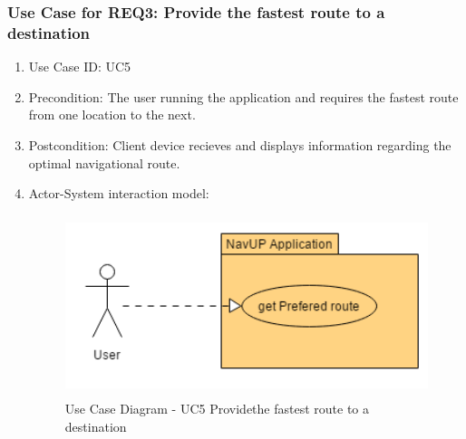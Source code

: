 		\subsubsection{Use Case for REQ3: Provide the fastest route to a destination}
			\begin{enumerate}
			\renewcommand{\labelenumi}{{\textbf{\arabic{enumi}.}}}
			\item Use Case ID: UC5
			\item Precondition: The user running the application and requires the fastest route from one location to the next.
			\item Postcondition: Client device recieves and displays information regarding the optimal navigational route.
			\item Actor-System interaction model:
				\graphicspath{ {./Diagrams/User/} }
				\begin{figure}[h]
				\caption{Use Case Diagram - UC5  Providethe fastest route to a destination}
				\includegraphics[height = 200px]{getPreferedRoute.png}
		\end{figure}
			\end{enumerate}

